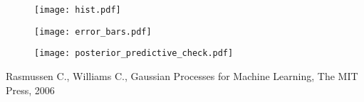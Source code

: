 \documentclass[a4paper, 10pt]{article}
\begin{document}
\begin{figure}
\begin{center}
\texttt{[image: hist.pdf]}
\end{center}
\end{figure}


\begin{figure}
\begin{center}
\texttt{[image: error\_bars.pdf]}
\end{center}
\end{figure}


\begin{figure}
\begin{center}
\texttt{[image: posterior\_predictive\_check.pdf]}
\end{center}
\end{figure}

\begin{thebibliography}{99} 
 Rasmussen C., Williams C., Gaussian Processes for Machine Learning, The MIT Press, 2006
\end{thebibliography}
\end{document}
